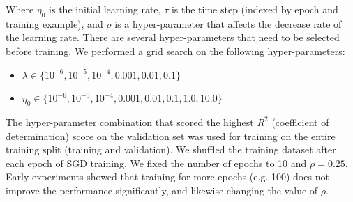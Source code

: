 \documentclass[letterpaper]{article}
\begin{document}
Where $\eta_0$ is the initial learning rate, $\tau$ is the time step (indexed by epoch and training example), and $\rho$ is a hyper-parameter that affects the decrease rate of the learning rate. There are several hyper-parameters that need to be selected before training. We performed a grid search on the following hyper-parameters:
\begin{itemize}
\item $\lambda \in \{10^{-6}, 10^{-5}, 10^{-4},0.001,0.01, 0.1\}$
\item $\eta_0 \in \{10^{-6}, 10^{-5}, 10^{-4},0.001,0.01, 0.1,1.0,10.0\}$
\end{itemize}

The hyper-parameter combination that scored the highest $R^2$ (coefficient of determination) score on the validation set was used for training on the entire training split (training and validation). We shuffled the training dataset after each epoch of SGD training. We fixed the number of epochs to 10 and $\rho=0.25$. Early experiments showed that training for more epochs (e.g. 100) does not improve the performance significantly, and likewise changing the value of $\rho$.  

\end{document}
